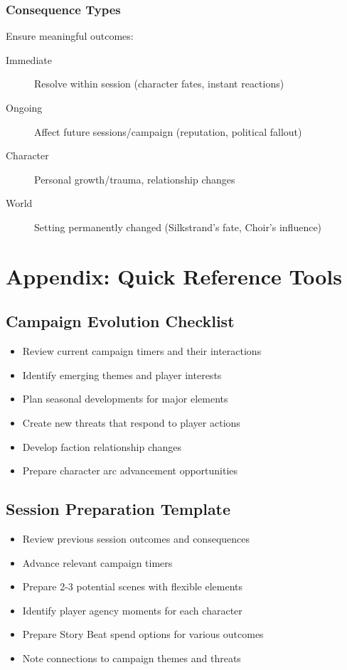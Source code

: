 \documentclass[11pt]{article}
\begin{document}
\subsubsection{Consequence Types}

Ensure meaningful outcomes:

\begin{description}
  \item[Immediate] Resolve within session (character fates, instant reactions)
  \item[Ongoing] Affect future sessions/campaign (reputation, political fallout)
  \item[Character] Personal growth/trauma, relationship changes
  \item[World] Setting permanently changed (Silkstrand's fate, Choir's influence)
\end{description}

\section{Appendix: Quick Reference Tools}

\subsection{Campaign Evolution Checklist}

\begin{itemize}
  \item[$\square$] Review current campaign timers and their interactions
  \item[$\square$] Identify emerging themes and player interests
  \item[$\square$] Plan seasonal developments for major elements
  \item[$\square$] Create new threats that respond to player actions
  \item[$\square$] Develop faction relationship changes
  \item[$\square$] Prepare character arc advancement opportunities
\end{itemize}

\subsection{Session Preparation Template}

\begin{itemize}
  \item[$\square$] Review previous session outcomes and consequences
  \item[$\square$] Advance relevant campaign timers
  \item[$\square$] Prepare 2-3 potential scenes with flexible elements
  \item[$\square$] Identify player agency moments for each character
  \item[$\square$] Prepare Story Beat spend options for various outcomes
  \item[$\square$] Note connections to campaign themes and threats
\end{itemize}
\end{document}
